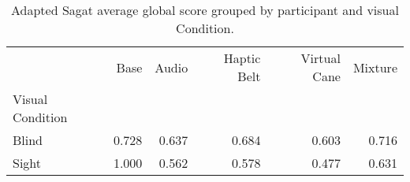 
\begin{table}[!htb]
\centering
\caption{Adapted Sagat average global score grouped by participant and visual Condition.}
\label{tab:sagat_average_group}
\begin{tabular}{lrrrrr}
\toprule
{} &  Base &  Audio &  Haptic Belt &  Virtual Cane &  Mixture \\
Visual Condition &       &        &              &               &          \\
\midrule
Blind            & 0.728 &  0.637 &        0.684 &         0.603 &    0.716 \\
Sight            & 1.000 &  0.562 &        0.578 &         0.477 &    0.631 \\
\bottomrule
\end{tabular}
\end{table}

